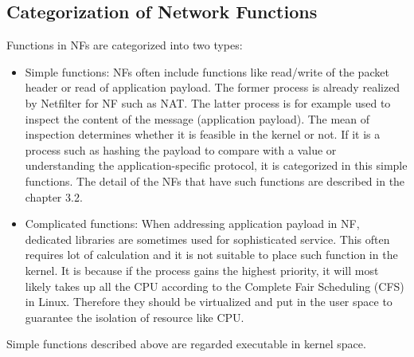  \subsection{Categorization of Network Functions}
 Functions in NFs are categorized into two types:
 \begin{itemize}
 	\item Simple functions: NFs often include functions like read/write of the packet header or read of application payload. The former process is already realized by Netfilter for NF such as NAT. The latter process is for example used to inspect the content of the message (application payload). The mean of inspection determines whether it is feasible in the kernel or not. If it is a  process such as hashing the payload to compare with a value or understanding the application-specific protocol, it is categorized in this simple functions. The detail of the NFs that have such functions are described in the chapter 3.2. 
 	\item Complicated functions: When addressing application payload in NF, dedicated libraries are sometimes used for sophisticated service. This often requires lot of calculation and it is not suitable to place such function in the kernel. It is because if the process gains the highest priority, it will most likely takes up all the CPU according to the Complete Fair Scheduling (CFS) in Linux. Therefore they should be virtualized and put in the user space to guarantee the isolation of resource like CPU. 
 \end{itemize}
 Simple functions described above are regarded executable in kernel space. 

